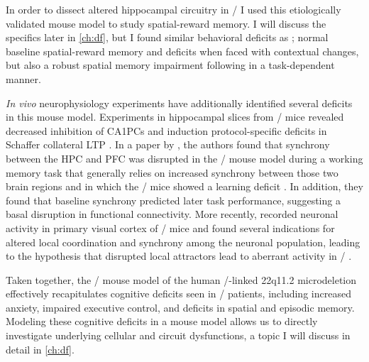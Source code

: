 In order to dissect altered hippocampal circuitry in \scz/ I used this etiologically validated mouse model to study spatial-reward memory.
I will discuss the specifics later in \autoref{ch:df}, but I found similar behavioral deficits as \citeauthor{Drew2011b}; normal baseline spatial-reward memory and deficits when faced with contextual changes, but also a robust spatial memory impairment following in a task-dependent manner.

\emph{In vivo} neurophysiology experiments have additionally identified several deficits in this mouse model.
Experiments in hippocampal slices from \df/ mice revealed decreased inhibition of CA1PCs and induction protocol-specific deficits in Schaffer collateral LTP \citep{Drew2011b}.
In a paper by \citeauthor{Sigurdsson2010}, the authors found that synchrony between the \ac{HPC} and \ac{PFC} was disrupted in the \df/ mouse model during a working memory task that generally relies on increased synchrony between those two brain regions and in which the \df/ mice showed a learning deficit \citep{Sigurdsson2010}.
In addition, they found that baseline synchrony predicted later task performance, suggesting a basal disruption in functional connectivity.
More recently, \citeauthor{Hamm2017} recorded neuronal activity in primary visual cortex of \df/ mice and found several indications for altered local coordination and synchrony among the neuronal population, leading to the hypothesis that disrupted local attractors lead to aberrant activity in \scz/ \citep{Hamm2017}.

Taken together, the \df/ mouse model of the human \scz/-linked 22q11.2 microdeletion effectively recapitulates cognitive deficits seen in \scz/ patients, including increased anxiety, impaired executive control, and deficits in spatial and episodic memory.
Modeling these cognitive deficits in a mouse model allows us to directly investigate underlying cellular and circuit dysfunctions, a topic I will discuss in detail in \autoref{ch:df}.

